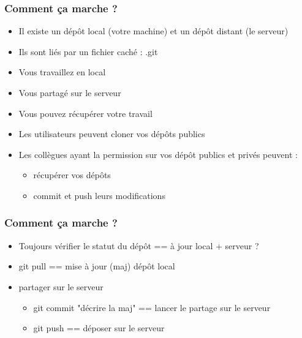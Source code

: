 \begin{frame}
  \frametitle{Comment ça marche ?}

\begin{itemize}
\item {} Il existe un dépôt local (votre machine) et un dépôt distant (le serveur) 
\item {} Ils sont liés par un fichier caché : .git
\item {} Vous travaillez en local
\item {} Vous partagé sur le serveur
\item {} Vous pouvez récupérer votre travail
\item \textcolor{green}{} Les utilisateurs peuvent cloner vos dépôts publics
\item {} Les collègues ayant la permission sur vos dépôt publics et privés peuvent : 
\begin{itemize}
\item \textcolor{green}{} récupérer vos dépôts 
\item \textcolor{green}{} commit et push leurs modifications
\end{itemize}
\end{itemize}
\end{frame}

\begin{frame}
  \frametitle{Comment ça marche ?}
\begin{itemize}
\item {} Toujours vérifier le statut du dépôt == à jour local + serveur ?
\item \textcolor{orange}{} git pull == mise à jour (maj) dépôt local
\item {} partager sur le serveur
\begin{itemize}
\item \textcolor{orange}{} git commit "décrire la maj" == lancer le partage sur le serveur
\item \textcolor{orange}{} git push == déposer sur le serveur
\end{itemize}
\end{itemize}
\end{frame}

